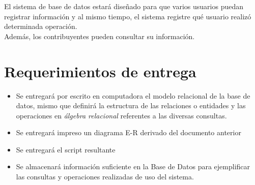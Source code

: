 \documentclass[12pt,spanish,lettersize]{article}
\begin{document}
El sistema de base de datos estar\'a dise\~nado para que varios usuarios puedan registrar informaci\'on y al mismo tiempo, el sistema registre qu\'e usuario realiz\'o determinada operaci\'on.\\

Adem\'as, los contribuyentes pueden consultar su informaci\'on.
\section{Requerimientos de entrega}
\begin{itemize}
\item Se entregar\'a por escrito en computadora el modelo relacional de la base de datos, mismo que definir\'a la estructura de las relaciones o entidades y las operaciones en \emph{\'algebra relacional} referentes a las diversas consultas.
\item Se entregar\'a impreso un diagrama E-R derivado del documento anterior
\item Se entregar\'a el script resultante
\item Se almacenar\'a informaci\'on suficiente en la Base de Datos para ejemplificar las consultas y operaciones realizadas de uso del sistema.
\end{itemize}
\end{document}
